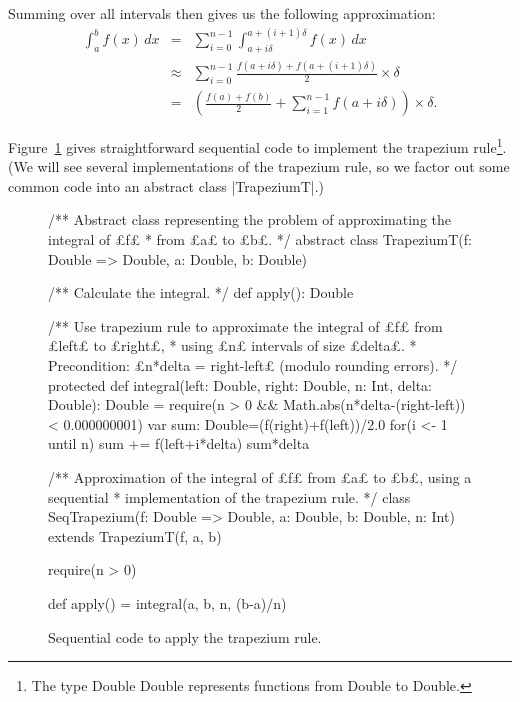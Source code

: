 Summing over all intervals then gives us the following approximation:
\begin{eqnarray*}
\int_a^b f(x) \, dx  & = & 
  \sum_{i = 0}^{n-1} \int_{a+i\delta}^{a+(i+1)\delta} f(x)\, dx \\
& \approx & 
  \sum_{i=0}^{n-1} \frac{f(a+i\delta) + f(a+(i+1)\delta)}{2} \times \delta \\
& = &
  \left( \frac{f(a)+f(b)}{2} + \sum_{i=1}^{n-1} f(a+i\delta) \right) \times \delta.
\end{eqnarray*}

Figure~\ref{fig:trapezium-sequential} gives straightforward sequential code to
implement the trapezium rule\footnote{The type {\scalashape Double
    \protect\SCALA{=>} Double} represents functions from {\scalashape Double}
  to {\scalashape Double}.}.  (We will see several implementations of the
trapezium rule, so we factor out some common code into an abstract class
|TrapeziumT|.)


\begin{figure}
\begin{scala}
/** Abstract class representing the problem of approximating the integral of £f£
  * from £a£ to £b£. */
abstract class TrapeziumT(f: Double => Double, a: Double, b: Double){
  /** Calculate the integral. */
  def apply(): Double

  /** Use trapezium rule to approximate the integral of £f£ from £left£ to £right£, 
    * using £n£ intervals of size £delta£. 
    * Precondition: £n*delta = right-left£ (modulo rounding errors). */
  protected 
  def integral(left: Double, right: Double, n: Int, delta: Double): Double = {
    require(n > 0 && Math.abs(n*delta-(right-left)) < 0.000000001) 
    var sum: Double=(f(right)+f(left))/2.0
    for(i <- 1 until n) sum += f(left+i*delta)
    sum*delta
  }
}

/** Approximation of the integral of £f£ from £a£ to £b£, using a sequential 
  * implementation of the trapezium rule. */
class SeqTrapezium(f: Double => Double, a: Double, b: Double, n: Int)
    extends TrapeziumT(f, a, b){
  require(n > 0)

  def apply() = integral(a, b, n, (b-a)/n)
}
\end{scala}
\caption{Sequential code to apply the trapezium rule.}
\label{fig:trapezium-sequential}
\end{figure}


